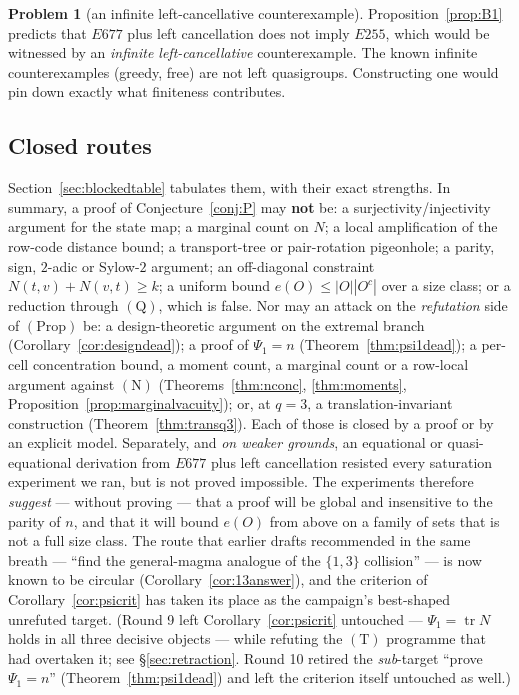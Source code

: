 \documentclass[11pt]{article}
\theoremstyle{plain}
\theoremstyle{definition}
\newtheorem{problem}[theorem]{Problem}
\theoremstyle{remark}
\numberwithin{equation}{section}
\newcommand{\tr}{\operatorname{tr}}
\begin{document}
\begin{problem}[an infinite left-cancellative counterexample]
Proposition~\ref{prop:B1} predicts that $E677$ plus left cancellation does not imply $E255$,
which would be witnessed by an \emph{infinite left-cancellative} counterexample. The known
infinite counterexamples (greedy, free) are not left quasigroups. Constructing one would
pin down exactly what finiteness contributes.
\end{problem}

\subsection{Closed routes}

Section~\ref{sec:blockedtable} tabulates them, with their exact strengths. In summary, a
proof of Conjecture~\ref{conj:P} may \textbf{not} be: a surjectivity/injectivity argument for
the state map; a marginal count on $N$; a local
amplification of the row-code distance bound; a transport-tree or pair-rotation pigeonhole; a
parity, sign, $2$-adic or Sylow-$2$ argument; an off-diagonal constraint
$N(t,v)+N(v,t)\ge k$; a uniform bound $e(O)\le|O||O^c|$ over a size class;
or a reduction through $(\mathrm{Q})$, which is false. Nor may an attack on the
\emph{refutation} side of $(\mathrm{Prop})$ be: a design-theoretic argument on the
extremal branch (Corollary~\ref{cor:designdead}); a proof of $\Psi_1 = n$
(Theorem~\ref{thm:psi1dead}); a per-cell concentration bound, a moment count, a
marginal count or a row-local argument against $(\mathrm{N})$
(Theorems~\ref{thm:nconc}, \ref{thm:moments}, Proposition~\ref{prop:marginalvacuity});
or, at $q = 3$, a translation-invariant construction (Theorem~\ref{thm:transq3}). Each
of those is closed by a proof or
by an explicit model. Separately, and \emph{on weaker grounds}, an equational or
quasi-equational derivation from $E677$ plus left cancellation resisted every saturation
experiment we ran, but is not proved impossible. The experiments therefore \emph{suggest}
--- without proving --- that a proof will be global and insensitive to the parity of $n$,
and that it will bound $e(O)$ from above on a family of sets that is not a full size class.
The route that earlier drafts recommended in the same breath --- ``find the general-magma
analogue of the $\{1,3\}$ collision'' --- is now known to be circular
(Corollary~\ref{cor:13answer}), and the criterion of Corollary~\ref{cor:psicrit} has taken
its place as the campaign's best-shaped unrefuted target. (Round 9 left
Corollary~\ref{cor:psicrit} untouched --- $\Psi_1 = \tr N$ holds in all three
decisive objects --- while refuting the $(\mathrm{T})$ programme that had
overtaken it; see \S\ref{sec:retraction}. Round 10 retired the \emph{sub}-target
``prove $\Psi_1 = n$'' (Theorem~\ref{thm:psi1dead}) and left the criterion itself
untouched as well.)
\end{document}
